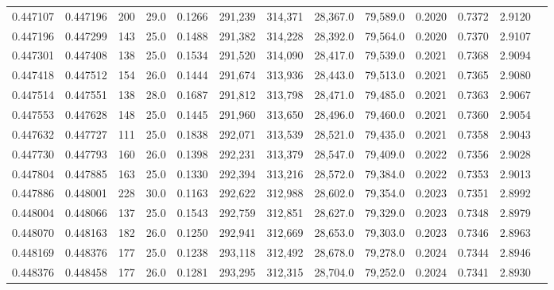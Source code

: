 \begin{tabular}{rrrrrrrrrrrrr}
0.447107 & 0.447196 &   200 & 29.0 &                                     0.1266 & 291,239 & 314,371 &  28,367.0 &  79,589.0 & 0.2020 & 0.7372 & 2.9120 \\
0.447196 & 0.447299 &   143 & 25.0 &                                     0.1488 & 291,382 & 314,228 &  28,392.0 &  79,564.0 & 0.2020 & 0.7370 & 2.9107 \\
0.447301 & 0.447408 &   138 & 25.0 &                                     0.1534 & 291,520 & 314,090 &  28,417.0 &  79,539.0 & 0.2021 & 0.7368 & 2.9094 \\
0.447418 & 0.447512 &   154 & 26.0 &                                     0.1444 & 291,674 & 313,936 &  28,443.0 &  79,513.0 & 0.2021 & 0.7365 & 2.9080 \\
0.447514 & 0.447551 &   138 & 28.0 &                                     0.1687 & 291,812 & 313,798 &  28,471.0 &  79,485.0 & 0.2021 & 0.7363 & 2.9067 \\
0.447553 & 0.447628 &   148 & 25.0 &                                     0.1445 & 291,960 & 313,650 &  28,496.0 &  79,460.0 & 0.2021 & 0.7360 & 2.9054 \\
0.447632 & 0.447727 &   111 & 25.0 &                                     0.1838 & 292,071 & 313,539 &  28,521.0 &  79,435.0 & 0.2021 & 0.7358 & 2.9043 \\
0.447730 & 0.447793 &   160 & 26.0 &                                     0.1398 & 292,231 & 313,379 &  28,547.0 &  79,409.0 & 0.2022 & 0.7356 & 2.9028 \\
0.447804 & 0.447885 &   163 & 25.0 &                                     0.1330 & 292,394 & 313,216 &  28,572.0 &  79,384.0 & 0.2022 & 0.7353 & 2.9013 \\
0.447886 & 0.448001 &   228 & 30.0 &                                     0.1163 & 292,622 & 312,988 &  28,602.0 &  79,354.0 & 0.2023 & 0.7351 & 2.8992 \\
0.448004 & 0.448066 &   137 & 25.0 &                                     0.1543 & 292,759 & 312,851 &  28,627.0 &  79,329.0 & 0.2023 & 0.7348 & 2.8979 \\
0.448070 & 0.448163 &   182 & 26.0 &                                     0.1250 & 292,941 & 312,669 &  28,653.0 &  79,303.0 & 0.2023 & 0.7346 & 2.8963 \\
0.448169 & 0.448376 &   177 & 25.0 &                                     0.1238 & 293,118 & 312,492 &  28,678.0 &  79,278.0 & 0.2024 & 0.7344 & 2.8946 \\
0.448376 & 0.448458 &   177 & 26.0 &                                     0.1281 & 293,295 & 312,315 &  28,704.0 &  79,252.0 & 0.2024 & 0.7341 & 2.8930 \\

\end{tabular}
